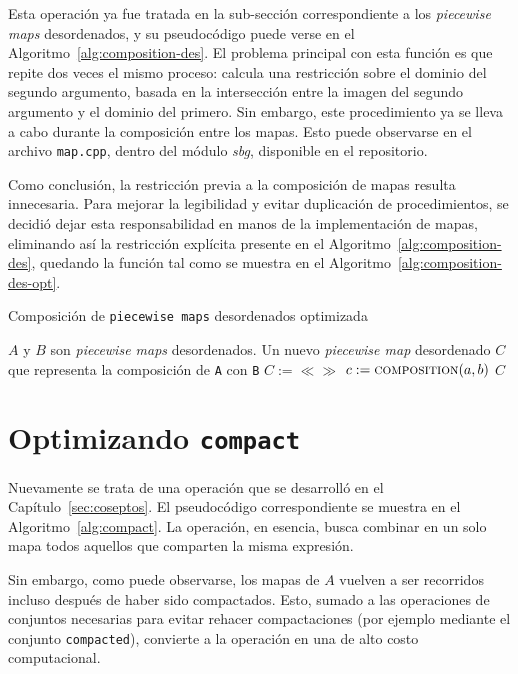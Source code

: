 Esta operación ya fue tratada en la sub-sección correspondiente a los \textit{piecewise maps} desordenados, y su pseudocódigo puede verse en el Algoritmo~\ref{alg:composition-des}. El problema principal con esta función es que repite dos veces el mismo proceso: calcula una restricción sobre el dominio del segundo argumento, basada en la intersección entre la imagen del segundo argumento y el dominio del primero. Sin embargo, este procedimiento ya se lleva a cabo durante la composición entre los mapas. Esto puede observarse en el archivo \texttt{map.cpp}, dentro del módulo \textit{sbg}, disponible en el repositorio.

Como conclusión, la restricción previa a la composición de mapas resulta innecesaria. Para mejorar la legibilidad y evitar duplicación de procedimientos, se decidió dejar esta responsabilidad en manos de la implementación de mapas, eliminando así la restricción explícita presente en el Algoritmo~\ref{alg:composition-des}, quedando la función tal como se muestra en el Algoritmo~\ref{alg:composition-des-opt}.


\begin{algorithm}
\caption{Composición de \texttt{piecewise maps} desordenados optimizada}
\label{alg:composition-des-opt}
\begin{algorithmic}[1]
\Require $A$ y $B$ son \textit{piecewise maps} desordenados.
\Ensure Un nuevo \textit{piecewise map} desordenado $C$ que representa la composición de \texttt{A} con \texttt{B}
    \State $C := \ll\gg$  
            \State $c := \Call{composition}{a, b}$
            \State {}
        \EndFor
    \EndFor
    \State \Return $C$
\EndFunction
\end{algorithmic}
\end{algorithm}

\section{Optimizando \texttt{compact}}

Nuevamente se trata de una operación que se desarrolló en el Capítulo~\ref{sec:coseptos}. El pseudocódigo correspondiente se muestra en el Algoritmo~\ref{alg:compact}. La operación, en esencia, busca combinar en un solo mapa todos aquellos que comparten la misma expresión. 

Sin embargo, como puede observarse, los mapas de $A$ vuelven a ser recorridos incluso después de haber sido compactados. Esto, sumado a las operaciones de conjuntos necesarias para evitar rehacer compactaciones (por ejemplo mediante el conjunto \texttt{compacted}), convierte a la operación en una de alto costo computacional.

